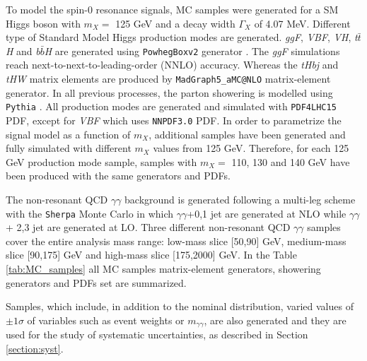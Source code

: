 \documentclass[a4paper, oneside, 11pt, openright]{book}
\begin{document}
			To model the spin-0 resonance signals, MC samples were generated for a SM Higgs boson with $m_X =$ 125 GeV and a decay width $\Gamma_X$ of 4.07 MeV. Different type of Standard Model Higgs production modes are generated. \textit{ggF}, \textit{VBF}, \textit{VH}, \textit{t$\bar{t}$H} and \textit{b$\bar{b}$H} are generated using \texttt{PowhegBoxv2} generator \cite{Pow_1,Pow_2,Pow_3,Pow_4}. The \textit{ggF} simulations reach next-to-next-to-leading-order (NNLO) accuracy. Whereas the \textit{tHbj} and \textit{tHW} matrix elements are produced by \texttt{MadGraph5\_aMC@NLO} matrix-element generator. In all previous processes, the parton showering is modelled using \texttt{Pythia} \cite{Pythia}. All production modes are generated and simulated with \texttt{PDF4LHC15} PDF, except for \textit{VBF} which uses \texttt{NNPDF3.0} PDF. In order to parametrize the signal model as a function of $m_X$, additional samples have been generated and fully simulated with different $m_X$ values from 125 GeV. Therefore, for each 125 GeV production mode sample, samples with $m_X =$ 110, 130 and 140 GeV have been produced with the same generators and PDFs.%
			
			The non-resonant QCD $\gamma\gamma$ background is generated following a multi-leg scheme with the \texttt{Sherpa} \cite{sherpa} Monte Carlo in which $\gamma\gamma$+0,1 jet are generated at NLO while $\gamma\gamma$+ 2,3 jet are generated at LO. Three different non-resonant QCD $\gamma\gamma$ samples cover the entire analysis mass range: low-mass slice [50,90] GeV, medium-mass slice [90,175] GeV and high-mass slice [175,2000] GeV. In the Table \ref{tab:MC_samples} all MC samples matrix-element generators, showering generators and PDFs set are summarized.
			
			Samples, which include, in addition to the nominal distribution, varied values of $\pm1\sigma$ of variables such as event weights or $m_{\gamma\gamma}$, are also generated and they are used for the study of systematic uncertainties, as described in Section \ref{section:syst}.
			
\end{document}
